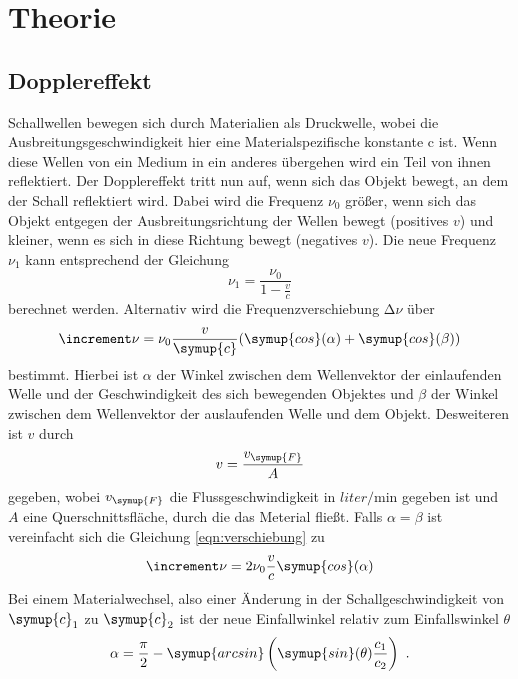 \section{Theorie}
\label{sec:Theorie}

\subsection{Dopplereffekt}

    Schallwellen bewegen sich durch Materialien als Druckwelle, wobei die Ausbreitungsgeschwindigkeit hier eine
    Materialspezifische konstante c ist. Wenn diese Wellen von ein Medium in ein anderes übergehen wird ein Teil von
    ihnen reflektiert. Der Dopplereffekt tritt nun auf, wenn sich das Objekt bewegt, an dem der Schall reflektiert wird.
    Dabei wird die Frequenz $\nu_0$ größer, wenn sich das Objekt entgegen der Ausbreitungsrichtung der Wellen bewegt 
    (positives $v$) und kleiner, wenn es sich in diese Richtung bewegt (negatives $v$). Die neue Frequenz $\nu_1$ kann 
    entsprechend der Gleichung
    \begin{equation}
        \nu_1=\frac{\nu_0}{1-\frac{v}{c}}
        \label{eqn:doppler}
    \end{equation}
    \noindent berechnet werden. Alternativ wird die Frequenzverschiebung $\increment \nu$ über
    \begin{equation}
        \increment \nu=\nu_0\frac{v}{\symup{c}}(\symup{cos}(\alpha)+\symup{cos}(\beta))
        \label{eqn:verschiebung}
    \end{equation}
    bestimmt. Hierbei ist $\alpha$ der Winkel zwischen dem Wellenvektor der einlaufenden Welle und der Geschwindigkeit
    des sich bewegenden Objektes und $\beta$ der Winkel zwischen dem Wellenvektor der auslaufenden Welle und dem Objekt.
    Desweiteren ist $v$ durch
    \begin{equation}
        v=\frac{v_{\symup{F}}}{A}\\
        \label{eqn:geschwindigkeit}
    \end{equation}
    gegeben, wobei $v_{\symup{F}}$ die Flussgeschwindigkeit in $\unit{liter\per\minute}$ gegeben ist und $A$ eine 
    Querschnittsfläche, durch die das Meterial fließt. 
    \noindent Falls $\alpha=\beta$ ist vereinfacht sich die Gleichung \ref{eqn:verschiebung} zu
    \begin{equation}
        \increment \nu=2\nu_0\frac{v}{c}\symup{cos}(\alpha)
        \label{eqn:verschiebung2}
    \end{equation}
    \noindent Bei einem Materialwechsel, also einer Änderung in der Schallgeschwindigkeit von $\symup{c}_1$ zu $\symup{c}_2$
    ist der neue Einfallwinkel relativ zum Einfallswinkel $\theta$
    \begin{equation}
        \alpha=\frac{\pi}{2}-\symup{arcsin}\left(\symup{sin}(\theta)\frac{c_1}{c_2}\right) \text{ .}
        \label{eqn:winkel}
    \end{equation}
    
